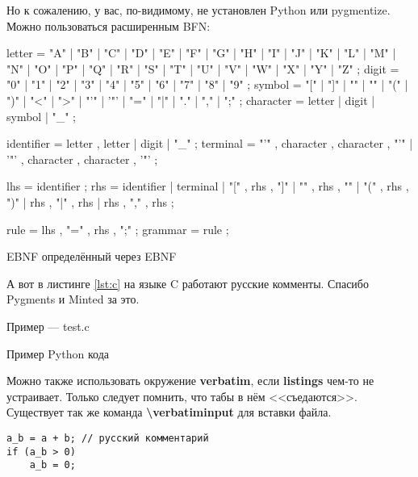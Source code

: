     \ifdefined\NoMinted
        Но к сожалению, у вас, по-видимому, не установлен Python или pygmentize.
    \else
        Можно пользоваться расширенным BFN:

        \begin{listing}[H]
            \begin{ebnfcode}
letter = "A" | "B" | "C" | "D" | "E" | "F" | "G"
       | "H" | "I" | "J" | "K" | "L" | "M" | "N"
       | "O" | "P" | "Q" | "R" | "S" | "T" | "U"
       | "V" | "W" | "X" | "Y" | "Z" ;
digit = "0" | "1" | "2" | "3" | "4" | "5" | "6" | "7" | "8" | "9" ;
symbol = "[" | "]" | "{" | "}" | "(" | ")" | "<" | ">"
       | "'" | '"' | "=" | "|" | "." | "," | ";" ;
character = letter | digit | symbol | "_" ;

identifier = letter , { letter | digit | "_" } ;
terminal = "'" , character , { character } , "'"
         | '"' , character , { character } , '"' ;

lhs = identifier ;
rhs = identifier
     | terminal
     | "[" , rhs , "]"
     | "{" , rhs , "}"
     | "(" , rhs , ")"
     | rhs , "|" , rhs
     | rhs , "," , rhs ;

rule = lhs , "=" , rhs , ";" ;
grammar = { rule } ;
            \end{ebnfcode}
            \caption{EBNF определённый через EBNF}
            \label{lst:ebnf}
        \end{listing}

        А вот в листинге \ref{lst:c} на языке C работают русские комменты. Спасибо
        Pygments и Minted за это.

        \begin{listing}[H]
            \caption{Пример — test.c}
        \end{listing}
        \label{lst:c}

        \begin{listing}[H]
            \caption{Пример Python кода}\label{lst:py}
        \end{listing}

    \fi
\fi

Можно также использовать окружение \textbf{verbatim}, если \textbf{listings} чем-то не
устраивает. Только следует помнить, что табы в нём <<съедаются>>. Существует так же команда \textbf{\textbackslash{}verbatiminput} для вставки файла.

\begin{verbatim}
a_b = a + b; // русский комментарий
if (a_b > 0)
    a_b = 0;
\end{verbatim}

